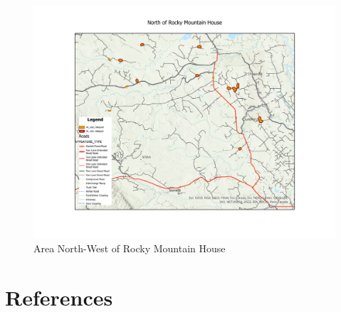 \documentclass[
]{article}
\begin{document}
\begin{figure}

{\centering \includegraphics[width=0.8\linewidth]{../graphics/North-of-RMH} 

}

\caption{Area North-West of Rocky Mountain House}\label{fig:RMC}
\end{figure}

\hypertarget{references}{%
\section{References}\label{references}}

\hypertarget{references}{}
\end{document}
